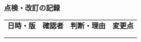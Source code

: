 \documentclass[11pt,a4paper]{article}
\begin{document}
\par{}\noindent\textbf{点検・改訂の記録}\par\vspace{1mm}
{\fontsize{8.5}{13}\selectfont
\begin{tabularx}{\linewidth}{@{}XXXX@{}}
\textbf{日時・版} & \textbf{確認者} & \textbf{判断・理由} & \textbf{変更点}\\[2mm]
\strut & \strut & \strut & \strut\\[5mm]
\strut & \strut & \strut & \strut\\[5mm]
\end{tabularx}
}\vspace{2mm}\par
\end{document}
